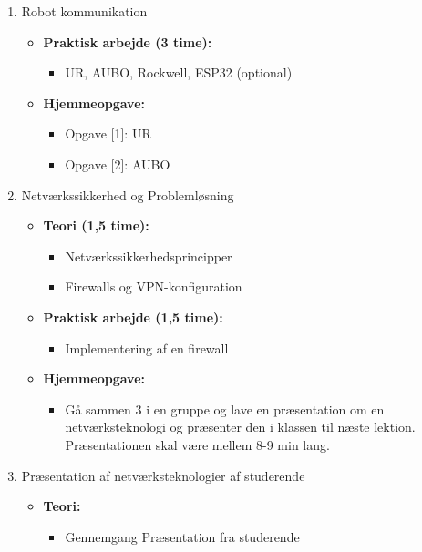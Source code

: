 \documentclass[12pt,a4paper]{article}
\begin{document}
\begin{enumerate}[leftmargin=*, label=\textbf{Dag \arabic* (3 timer)}]
		\item Robot kommunikation
		\begin{itemize}
			\item \textbf{Praktisk arbejde (3 time):}
			\begin{itemize}
				\item UR, AUBO, Rockwell, ESP32 (optional)
			\end{itemize}
			\item \textbf{Hjemmeopgave:}
			\begin{itemize}
				\item Opgave [1]: UR 
				\item Opgave [2]: AUBO
			\end{itemize}
		\end{itemize}
		
		\item Netværkssikkerhed og Problemløsning 
		\begin{itemize}
			\item \textbf{Teori (1,5 time):}
			\begin{itemize}
				\item Netværkssikkerhedsprincipper 
				\item Firewalls og VPN-konfiguration 
			\end{itemize}
			\item \textbf{Praktisk arbejde (1,5 time):}
			\begin{itemize}
				\item Implementering af en firewall
			\end{itemize}
			\item \textbf{Hjemmeopgave:}
			\begin{itemize}
				\item Gå sammen 3 i en gruppe og lave en præsentation om en netværksteknologi og præsenter den i klassen til næste lektion. Præsentationen skal være mellem 8-9 min lang.
			\end{itemize}
		\end{itemize}

		\item Præsentation af netværksteknologier af studerende
		\begin{itemize}
			\item \textbf{Teori:}
			\begin{itemize}
				\item Gennemgang Præsentation fra studerende
			\end{itemize}
		\end{itemize}
		

\end{enumerate}
\end{document}
